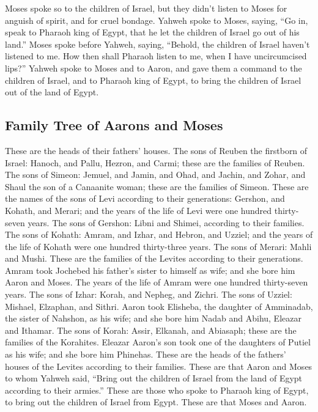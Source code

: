  Moses spoke so to the children of Israel, but they didn't
listen to Moses for anguish of spirit, and for cruel bondage.
 Yahweh spoke to Moses, saying,  ``Go in,
speak to Pharaoh king of Egypt, that he let the children of Israel go
out of his land.''  Moses spoke before Yahweh, saying,
``Behold, the children of Israel haven't listened to me. How then shall
Pharaoh listen to me, when I have uncircumcised lips?'' 
Yahweh spoke to Moses and to Aaron, and gave them a command to the
children of Israel, and to Pharaoh king of Egypt, to bring the children
of Israel out of the land of Egypt.

\hypertarget{family-tree-of-aarons-and-moses}{%
\subsection{Family Tree of Aarons and
Moses}\label{family-tree-of-aarons-and-moses}}

 These are the heads of their fathers' houses. The sons
of Reuben the firstborn of Israel: Hanoch, and Pallu, Hezron, and Carmi;
these are the families of Reuben.  The sons of Simeon:
Jemuel, and Jamin, and Ohad, and Jachin, and Zohar, and Shaul the son of
a Canaanite woman; these are the families of Simeon. 
These are the names of the sons of Levi according to their generations:
Gershon, and Kohath, and Merari; and the years of the life of Levi were
one hundred thirty-seven years.  The sons of Gershon:
Libni and Shimei, according to their families.  The sons
of Kohath: Amram, and Izhar, and Hebron, and Uzziel; and the years of
the life of Kohath were one hundred thirty-three years. 
The sons of Merari: Mahli and Mushi. These are the families of the
Levites according to their generations.  Amram took
Jochebed his father's sister to himself as wife; and she bore him Aaron
and Moses. The years of the life of Amram were one hundred thirty-seven
years.  The sons of Izhar: Korah, and Nepheg, and Zichri.
 The sons of Uzziel: Mishael, Elzaphan, and Sithri.
 Aaron took Elisheba, the daughter of Amminadab, the
sister of Nahshon, as his wife; and she bore him Nadab and Abihu,
Eleazar and Ithamar.  The sons of Korah: Assir, Elkanah,
and Abiasaph; these are the families of the Korahites. 
Eleazar Aaron's son took one of the daughters of Putiel as his wife; and
she bore him Phinehas. These are the heads of the fathers' houses of the
Levites according to their families.  These are that
Aaron and Moses to whom Yahweh said, ``Bring out the children of Israel
from the land of Egypt according to their armies.'' 
These are those who spoke to Pharaoh king of Egypt, to bring out the
children of Israel from Egypt. These are that Moses and Aaron.


